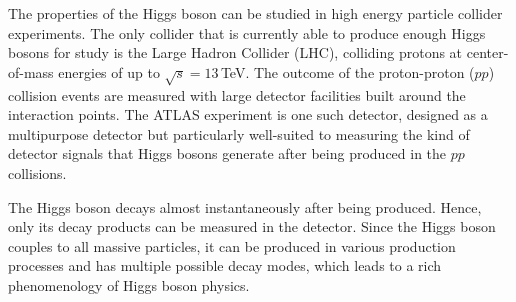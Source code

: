 
The properties of the Higgs boson can be studied in high energy particle collider experiments. 
The only collider that is currently able to produce enough Higgs bosons for study is the Large Hadron Collider (LHC), colliding protons at center-of-mass energies of up to $\sqrt{s} = 13\,$TeV. 
The outcome of the proton-proton ($pp$) collision events are measured with large detector facilities built around the interaction points. 
The ATLAS experiment is one such detector, designed as a multipurpose detector but particularly well-suited to measuring the kind of detector signals that Higgs bosons generate after being produced in the $pp$ collisions.

The Higgs boson decays almost instantaneously after being produced. Hence, only its decay products can be measured in the detector. Since the Higgs boson couples to all massive particles, it can be produced in various production processes and has multiple possible decay modes, which leads to a rich phenomenology of Higgs boson physics. 

